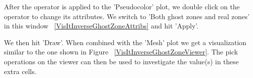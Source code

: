 
After the operator is applied to the 'Pseudocolor' plot, we double
click on the operator to change its attributes. We switch to 'Both
ghost zones and real zones' in this window
~\ref{VisItInverseGhostZoneAttribs} and hit 'Apply'.


We then hit 'Draw'. When combined with the 'Mesh' plot we get a visualization similar to the one shown in Figure ~\ref{VisItInverseGhostZoneViewer}. The pick operations on the viewer can then be used to investigate the value(s) in these extra cells.


\begin{figure}[h]
  \centering
 \vspace{5pt}
  \hspace{20pt}
 \hspace{20pt}
  \caption{}
 \vspace{-10pt}
  \label{}
\end{figure}


